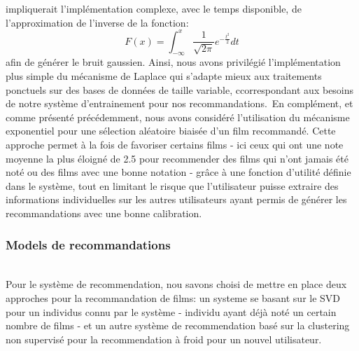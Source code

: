 \documentclass{article}
\begin{document}
impliquerait l'implémentation complexe, avec le temps disponible, de l'approximation de l'inverse de la fonction:
\begin{equation}
    F(x) = \int_{-\infty}^{x} \frac{1}{\sqrt{2\pi}} e^{-\frac{t^2}{2}} dt
\end{equation}
afin de générer le bruit gaussien. Ainsi, nous avons privilégié l'implémentation plus simple du mécanisme de Laplace qui s’adapte mieux aux traitements 
ponctuels sur des bases de données de taille variable, ccorrespondant aux besoins de notre système d'entrainement pour nos recommandations.\
En complément, et comme présenté précédemment, nous avons considéré l'utilisation du mécanisme exponentiel pour une sélection aléatoire biaisée d'un film recommandé.
Cette approche permet à la fois de favoriser certains films - ici ceux qui ont une note moyenne la plus éloigné de 2.5 pour recommender des films qui n'ont jamais été noté ou des
films avec une bonne notation - grâce à une fonction d'utilité définie dans le système, tout en limitant le risque que 
l'utilisateur puisse extraire des informations individuelles sur les autres utilisateurs ayant permis de générer les recommandations avec une bonne 
calibration.

\subsubsection{Models de recommandations}
$ $\\
Pour le système de recommendation, nou savons choisi de mettre en place deux approches pour la recommandation de films: un systeme se basant sur le SVD pour un 
individus connu par le système - individu ayant déjà noté un certain nombre de films - et un autre système de recommendation basé sur la clustering non supervisé 
pour la recommendation à froid pour un nouvel utilisateur.
\end{document}
